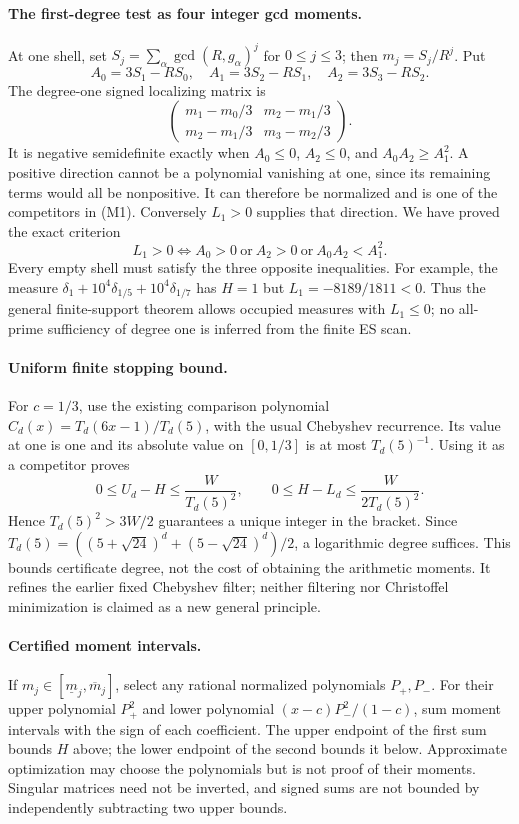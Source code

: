 \paragraph{The first-degree test as four integer gcd moments.}
At one shell, set $S_j=\sum_\alpha\gcd(R,g_\alpha)^j$ for $0\le j\le3$;
then $m_j=S_j/R^j$. Put
\[
 A_0=3S_1-RS_0,\quad A_1=3S_2-RS_1,\quad A_2=3S_3-RS_2.
 \tag{M8}
\]
The degree-one signed localizing matrix is
\[
 \begin{pmatrix}m_1-m_0/3&m_2-m_1/3\\
 m_2-m_1/3&m_3-m_2/3\end{pmatrix}.
\]
It is negative semidefinite exactly when
$A_0\le0$, $A_2\le0$, and $A_0A_2\ge A_1^2$.
A positive direction cannot be a polynomial vanishing at one, since its
remaining terms would all be nonpositive. It can therefore be normalized
and is one of the competitors in (M1). Conversely $L_1>0$ supplies that
direction. We have proved the exact criterion
\[
 \boxed{L_1>0\iff A_0>0\ \text{or}\ A_2>0\ \text{or}\ A_0A_2<A_1^2.}
 \tag{M9}
\]
Every empty shell must satisfy the three opposite inequalities. For example, the measure $\delta_1+10^4\delta_{1/5}+10^4\delta_{1/7}$ has
$H=1$ but $L_1=-8189/1811<0$. Thus the general
finite-support theorem allows occupied measures with $L_1\le0$;
no all-prime sufficiency of degree one is inferred from the finite ES scan.

\paragraph{Uniform finite stopping bound.}
For $c=1/3$, use the existing comparison polynomial
$C_d(x)=T_d(6x-1)/T_d(5)$, with the usual Chebyshev recurrence. Its value at one
is one and its absolute value on $[0,1/3]$ is at most $T_d(5)^{-1}$.
Using it as a competitor proves
\[
 0\le U_d-H\le\frac{W}{T_d(5)^2},\qquad
 0\le H-L_d\le\frac{W}{2T_d(5)^2}.
 \tag{M7}
\]
Hence $T_d(5)^2>3W/2$ guarantees a unique integer in the bracket. Since
$T_d(5)=((5+\sqrt{24})^d+(5-\sqrt{24})^d)/2$, a logarithmic degree suffices.
This bounds certificate degree, not the cost of obtaining the arithmetic
moments. It refines the earlier fixed Chebyshev filter; neither filtering nor
Christoffel minimization is claimed as a new general principle.

\paragraph{Certified moment intervals.}
If $m_j\in[\underline m_j,\overline m_j]$, select any rational normalized
polynomials $P_+,P_-$. For their upper polynomial $P_+^2$ and lower polynomial
$(x-c)P_-^2/(1-c)$, sum moment intervals with the sign of each coefficient.
The upper endpoint of the first sum bounds $H$ above; the lower endpoint of
the second bounds it below. Approximate optimization may choose the polynomials
but is not proof of their moments. Singular matrices need not be inverted,
and signed sums are not bounded by independently subtracting two upper bounds.


